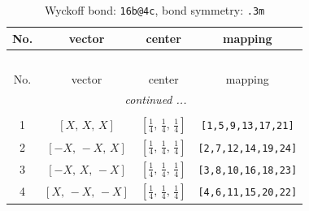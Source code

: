 \documentclass[fleqn,8pt]{jsarticle}
\begin{document}
\renewcommand{\arraystretch}{1.2}
\begin{longtable}{cccc}
\caption{Wyckoff bond: {\tt 16b@4c}, bond symmetry: {\tt .3m}}
 \\
 \hline \hline
No. & vector & center & mapping \\ \hline \endfirsthead

\multicolumn{3}{l}{\tablename\ \thetable{}} \\
 \hline \hline
No. & vector & center & mapping \\ \hline \endhead

 \hline \hline
\multicolumn{3}{r}{\footnotesize\it continued ...} \\ \endfoot

 \hline \hline
\multicolumn{3}{r}{} \\ \endlastfoot

1 & $\left[ X,\, X,\, X \right]$ & $\left[ \frac{1}{4},\, \frac{1}{4},\, \frac{1}{4} \right]$ & {\tt [1,5,9,13,17,21]} \\ \hline
2 & $\left[ - X,\, - X,\, X \right]$ & $\left[ \frac{1}{4},\, \frac{1}{4},\, \frac{1}{4} \right]$ & {\tt [2,7,12,14,19,24]} \\ \hline
3 & $\left[ - X,\, X,\, - X \right]$ & $\left[ \frac{1}{4},\, \frac{1}{4},\, \frac{1}{4} \right]$ & {\tt [3,8,10,16,18,23]} \\ \hline
4 & $\left[ X,\, - X,\, - X \right]$ & $\left[ \frac{1}{4},\, \frac{1}{4},\, \frac{1}{4} \right]$ & {\tt [4,6,11,15,20,22]} \\
\end{longtable}
\renewcommand{\arraystretch}{1.2}
\end{document}

